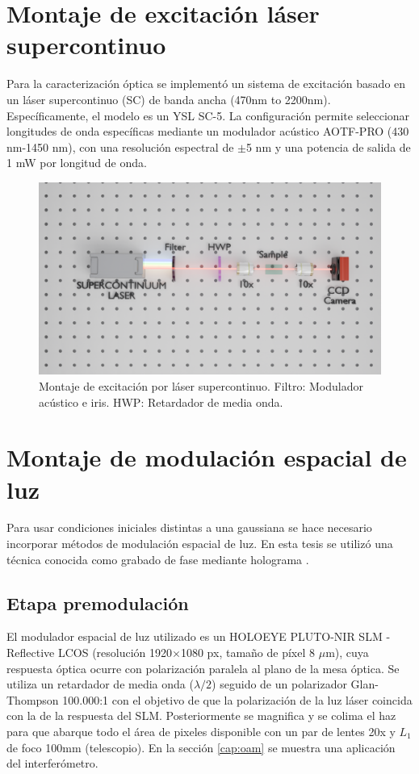 \section{Montaje de excitación láser supercontinuo \label{cap:wavelength}}

Para la caracterización óptica se implementó un sistema de excitación basado en un láser supercontinuo (SC) de banda ancha (470nm to 2200nm). Específicamente, el modelo es un YSL SC-5. La configuración permite seleccionar longitudes de onda específicas mediante un modulador acústico AOTF-PRO (430 nm-1450 nm), con una resolución espectral de $\pm$5 nm y una potencia de salida de 1 mW por longitud de onda.

\begin{figure}[H]
    \centering
    \includegraphics[width=\linewidth, trim={5cm 9cm 3cm 7cm},clip]{media/SC_setup}
    \caption[Montaje de excitación por láser supercontinuo.]{Montaje de excitación por láser supercontinuo. Filtro: Modulador acústico e iris. HWP: Retardador de media onda.}
\end{figure}

\section{Montaje de modulación espacial de luz}

Para usar condiciones iniciales distintas a una gaussiana se hace necesario incorporar métodos de modulación espacial de luz. En esta tesis se utilizó una técnica conocida como grabado de fase mediante holograma \citep{terhalle}.

\subsection{Etapa premodulación}
El modulador espacial de luz utilizado es un HOLOEYE PLUTO-NIR SLM - Reflective LCOS (resolución 1920$\times$1080 px, tamaño de píxel 8 $\mu$m), cuya respuesta óptica ocurre con polarización paralela al plano de la mesa óptica. Se utiliza un retardador de media onda ($\lambda/2$) seguido de un polarizador Glan-Thompson 100.000:1 con el objetivo de que la polarización de la luz láser coincida con la de la respuesta del SLM. Posteriormente se magnifica y se colima el haz para que abarque todo el área de pixeles disponible con un par de lentes 20x y $L_1$ de foco 100mm (telescopio). En la sección \ref{cap:oam} se muestra una aplicación del interferómetro.

